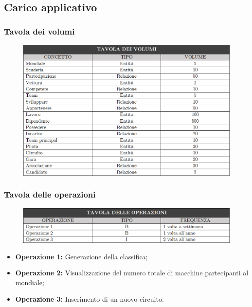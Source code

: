 \subsection{Carico applicativo}

\subsubsection{Tavola dei volumi}
\begin{figure}[H]
    \centering
    \includegraphics[scale = 0.74]{Images/Table/Tavola volumi.png}
\end{figure}

\subsubsection{Tavola delle operazioni}
\begin{figure}[H]
    \centering
    \includegraphics[scale = 0.74]{Images/Table/Tavola operazioni.png}
\end{figure}

\begin{itemize}
    \item \textbf{Operazione 1:} Generazione della classifica;
    \item \textbf{Operazione 2:} Visualizzazione del numero totale di macchine partecipanti al mondiale;
    \item \textbf{Operazione 3:} Inserimento di un nuovo circuito.
\end{itemize}

